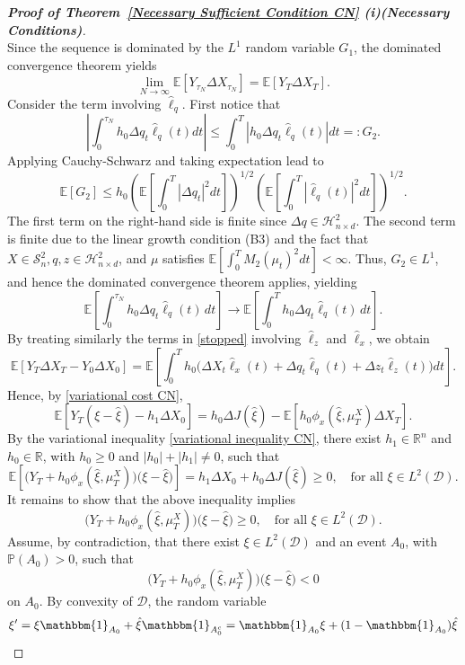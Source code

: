 \documentclass[11pt,a4paper]{article}
\begin{document}
\begin{proof}[\textup{\textbf{Proof of Theorem~\ref{Necessary Sufficient Condition CN} (i)(Necessary Conditions)}}]
\[\]
Since the sequence is dominated by the $L^1$ random variable $G_1$, the dominated convergence theorem yields
\[
\lim_{N \to \infty} \mathbb{E}[Y_{\tau_N} \Delta X_{\tau_N}] = \mathbb{E}[Y_T \Delta X_T].
\]
Consider the term involving $\hat{\ell}_q$. First notice that
\[
\left| \int_0^{\tau_N} h_0 \Delta q_t \hat{\ell}_q(t) dt \right| \leq \int_0^T |h_0 \Delta q_t \hat{\ell}_q(t)| dt =: G_2.
\]
Applying Cauchy-Schwarz and taking expectation lead to
\[
\mathbb{E}[G_2] \leq h_0 \left( \mathbb{E} \left[\int_0^T |\Delta q_t|^2 dt\right] \right)^{1/2} \left( \mathbb{E} \left[ \int_0^T |\hat{\ell}_q(t)|^2 dt \right] \right)^{1/2}.
\]
The first term on the right-hand side is finite since $\Delta q \in \mathcal{H}^2_{n \times d}$. The second term is finite due to the linear growth condition (B3) and the fact that $X \in \mathcal{S}^2_n, q, z \in \mathcal{H}^2_{n \times d}$, and $\mu$ satisfies $\mathbb E \left[\int_0^T M_2(\mu_t)^2 dt\right]<\infty$. Thus, $G_2 \in L^1$, and hence the dominated convergence theorem applies, yielding
\[
\mathbb E\left[\int_0^{\tau_N} h_0\Delta q_t\hat\ell_q(t)\,dt \right]
\to
\mathbb E \left[\int_0^T h_0\Delta q_t\hat\ell_q(t)\,dt\right].
\]
By treating similarly the terms in \eqref{stopped} involving $\hat\ell_z$  and $\hat\ell_x$, we obtain
\[
\mathbb{E}\left[Y_T \Delta X_T - Y_0 \Delta X_0\right] = \mathbb{E}\left[\int_0^T h_0 \Big(\Delta X_t \hat \ell_x(t) + \Delta q_t \hat \ell_q(t) + \Delta z_t \hat \ell_z(t) \Big)dt\right].
\]
Hence, by  \eqref{variational cost CN},
\[
\mathbb E\left[ Y_T(\xi-\hat \xi)-h_1\Delta{X}_0\right]=h_0\Delta{J}(\hat \xi)-\mathbb E\left[h_0\phi_x(\hat \xi,\mu_T^X)\Delta{X}_T\right].
\]
By the variational inequality \eqref{variational inequality CN}, there exist $h_1 \in \mathbb{R}^n$ and $h_0 \in \mathbb{R}$, with $h_0 \geq 0$ and $|h_0|+|h_1|\neq 0$, such that
\begin{equation}\label{ineq}
\mathbb E \left[ \big(Y_T +h_0\phi_x(\hat \xi,\mu_T^X)\big) \big(\xi-\hat \xi\big) \right]= h_1 \Delta{X}_0+h_0\Delta{J}(\hat \xi) \geq 0, \quad \textrm{for all }\xi \in L^2 (\mathcal D).
\end{equation}
It remains to show that the above inequality implies
\[
\big(Y_T +h_0\phi_x(\hat \xi,\mu_T^X)\big)\big( \xi-\hat \xi\big) \geq 0, \quad \textrm{for all }\xi \in L^2(\mathcal{D}).
\]
Assume, by contradiction, that there exist $\xi \in L^2(\mathcal D)$ and an event $A_0$, with $\mathbb P(A_0)>0$, such that $$\big(Y_T +h_0\phi_x(\hat \xi,\mu_T^X)\big)\big( \xi-\hat \xi\big) < 0$$ on $A_0$. By convexity of $\mathcal{D}$, the random variable $$\xi'=\xi \mathbbm{1} _{A_0}+\hat \xi \mathbbm{1} _{A_0^c} = \mathbbm{1} _{A_0}\xi+(1-\mathbbm{1} _{A_0})\hat \xi$$ 

\end{proof}
\end{document}
